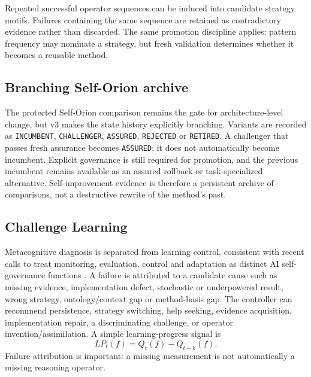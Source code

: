 Repeated successful operator sequences can be induced into candidate strategy motifs. Failures containing the same sequence are retained as contradictory evidence rather than discarded. The same promotion discipline applies: pattern frequency may nominate a strategy, but fresh validation determines whether it becomes a reusable method.

\subsection{Branching Self-Orion archive}
The protected Self-Orion comparison remains the gate for architecture-level change, but v3 makes the state history explicitly branching. Variants are recorded as \texttt{INCUMBENT}, \texttt{CHALLENGER}, \texttt{ASSURED}, \texttt{REJECTED} or \texttt{RETIRED}. A challenger that passes fresh assurance becomes \texttt{ASSURED}; it does not automatically become incumbent. Explicit governance is still required for promotion, and the previous incumbent remains available as an assured rollback or task-specialized alternative. Self-improvement evidence is therefore a persistent archive of comparisons, not a destructive rewrite of the method's past.
\subsection{Challenge Learning}
Metacognitive diagnosis is separated from learning control, consistent with recent calls to treat monitoring, evaluation, control and adaptation as distinct AI self-governance functions \cite{ji2026}. A failure is attributed to a candidate cause such as missing evidence, implementation defect, stochastic or underpowered result, wrong strategy, ontology/context gap or method-basis gap. The controller can recommend persistence, strategy switching, help seeking, evidence acquisition, implementation repair, a discriminating challenge, or operator invention/assimilation. A simple learning-progress signal is
\begin{equation}LP_t(f)=Q_t(f)-Q_{t-k}(f).\end{equation}
Failure attribution is important: a missing measurement is not automatically a missing reasoning operator.

